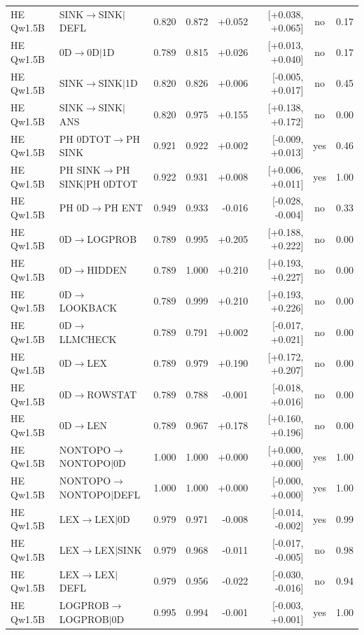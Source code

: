 \begin{longtable}{llrrrrcc}
HE Qw1.5B & SINK$\to$SINK$\mid$DEFL & 0.820 & 0.872 & +0.052 & [+0.038, +0.065] & no & 0.17 \\
HE Qw1.5B & 0D$\to$0D$\mid$1D & 0.789 & 0.815 & +0.026 & [+0.013, +0.040] & no & 0.17 \\
HE Qw1.5B & SINK$\to$SINK$\mid$1D & 0.820 & 0.826 & +0.006 & [-0.005, +0.017] & no & 0.45 \\
HE Qw1.5B & SINK$\to$SINK$\mid$ANS & 0.820 & 0.975 & +0.155 & [+0.138, +0.172] & no & 0.00 \\
HE Qw1.5B & PH 0DTOT$\to$PH SINK & 0.921 & 0.922 & +0.002 & [-0.009, +0.013] & yes & 0.46 \\
HE Qw1.5B & PH SINK$\to$PH SINK$\mid$PH 0DTOT & 0.922 & 0.931 & +0.008 & [+0.006, +0.011] & yes & 1.00 \\
HE Qw1.5B & PH 0D$\to$PH ENT & 0.949 & 0.933 & -0.016 & [-0.028, -0.004] & no & 0.33 \\
HE Qw1.5B & 0D$\to$LOGPROB & 0.789 & 0.995 & +0.205 & [+0.188, +0.222] & no & 0.00 \\
HE Qw1.5B & 0D$\to$HIDDEN & 0.789 & 1.000 & +0.210 & [+0.193, +0.227] & no & 0.00 \\
HE Qw1.5B & 0D$\to$LOOKBACK & 0.789 & 0.999 & +0.210 & [+0.193, +0.226] & no & 0.00 \\
HE Qw1.5B & 0D$\to$LLMCHECK & 0.789 & 0.791 & +0.002 & [-0.017, +0.021] & no & 0.00 \\
HE Qw1.5B & 0D$\to$LEX & 0.789 & 0.979 & +0.190 & [+0.172, +0.207] & no & 0.00 \\
HE Qw1.5B & 0D$\to$ROWSTAT & 0.789 & 0.788 & -0.001 & [-0.018, +0.016] & no & 0.00 \\
HE Qw1.5B & 0D$\to$LEN & 0.789 & 0.967 & +0.178 & [+0.160, +0.196] & no & 0.00 \\
HE Qw1.5B & NONTOPO$\to$NONTOPO$\mid$0D & 1.000 & 1.000 & +0.000 & [+0.000, +0.000] & yes & 1.00 \\
HE Qw1.5B & NONTOPO$\to$NONTOPO$\mid$DEFL & 1.000 & 1.000 & +0.000 & [-0.000, +0.000] & yes & 1.00 \\
HE Qw1.5B & LEX$\to$LEX$\mid$0D & 0.979 & 0.971 & -0.008 & [-0.014, -0.002] & yes & 0.99 \\
HE Qw1.5B & LEX$\to$LEX$\mid$SINK & 0.979 & 0.968 & -0.011 & [-0.017, -0.005] & no & 0.98 \\
HE Qw1.5B & LEX$\to$LEX$\mid$DEFL & 0.979 & 0.956 & -0.022 & [-0.030, -0.016] & no & 0.94 \\
HE Qw1.5B & LOGPROB$\to$LOGPROB$\mid$0D & 0.995 & 0.994 & -0.001 & [-0.003, +0.001] & yes & 1.00 \\

\end{longtable}
